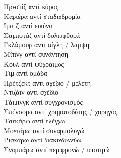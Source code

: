\documentclass[a4paper]{article}
\begin{document}
\begin{multicols}{3}
 Πρεστίζ αντί κύρος \\
 Καριέρα αντί σταδιοδρομία \\
 Ίματζ αντί εικόνα \\
 Σαμποτάζ αντί δολιοφθορά \\
 Γκλάμουρ αντί αίγλη / λάμψη \\ 
 Μίτινγ αντί συνάντηση \\
 Κουλ αντί ψύχραιμος \\
 Τιμ αντί ομάδα \\
 Πρότζεκτ αντί σχέδιο / μελέτη \\
 Ντιζάιν αντί σχέδιο \\
 Τάιμινγκ αντί συγχρονισμός \\
 Σπόνσορα αντί χρηματοδότης / χορηγός \\
 Τσεκάρω αντί ελέγχω \\
 Μοντάρω αντί συναρμολογώ \\
 Ρισκάρω αντί διακινδυνεύω \\
 Σνομπάρω αντί περιφρονώ / υποτιμώ 
\end{multicols}
\end{document}
